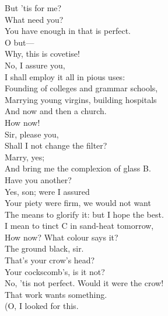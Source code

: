 \documentclass[a4paper,oneside,12pt]{memoir}
\begin{document}
\begin{drama*}
\mammonspeaks {} But 'tis for me?\\
\subtlespeaks {} What need you?\\
You have enough in that is perfect.\\
\mammonspeaks {} O but---\\
\subtlespeaks Why, this is covetise!\\
\mammonspeaks {} No, I assure you,\\
I shall employ it all in pious uses:\\
Founding of colleges and grammar schools,\\
Marrying young virgins, building hospitals\\
And now and then a church.\\
\subtlespeaks {} How now!\\
\facespeaks {} Sir, please you,\\
Shall I not change the filter?\\
\subtlespeaks {} Marry, yes;\\
And bring me the complexion of glass B.\\
\mammonspeaks Have you another?\\
\subtlespeaks {} Yes, son; were I assured\\
Your piety were firm, we would not want\\
The means to glorify it: but I hope the best.\\
I mean to tinct C in sand-heat tomorrow,\\
How now? What colour says it?\\
\facespeaks {} The ground black, sir.\\
\mammonspeaks That's your crow's head?\\
\surlyspeaks {} Your cockscomb's, is it not?\\
\subtlespeaks No, 'tis not perfect. Would it were the crow!\\
That work wants something.\\
\surlyspeaks {} (O, I looked for this.\\

\end{drama*}
\end{document}
